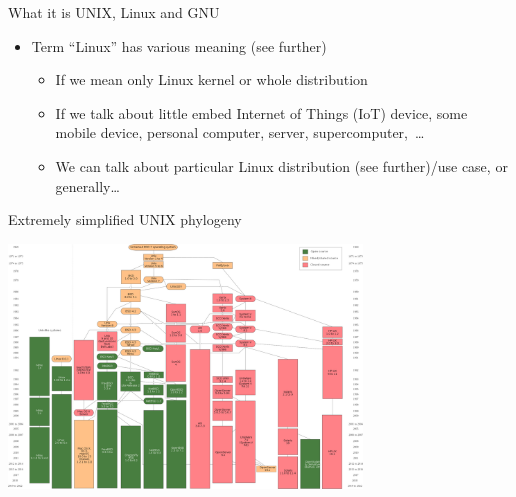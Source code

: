 \documentclass[compress, ucs, xelatex, 11pt, xcolor=svgnames, aspectratio=169,
	hyperref={
		bookmarks=true,
		unicode=true,
		colorlinks=true,
		pdftitle={Linux, command line and MetaCentrum},
		plainpages=false,
		pdfauthor={Vojtech Zeisek},
		pdfsubject={Course about use of Linux command line, writing shell scripts and using MetaCentrum of CESNET},
		pdfcreator={XeLaTeX},
		pdfkeywords={Linux, GNU, BASH, shell, command line, MetaCentrum},
		linkcolor=DarkRed, %
		anchorcolor=DarkBlue, %
		citecolor=Indigo, %
		filecolor=NavyBlue, %
		menucolor=DarkMagenta, %
		urlcolor=DarkBlue, %
		pdftex},
	url={hyphens, lowtilde} %
	]{beamer}
\begin{document}
\begin{frame}[allowframebreaks]{What it is UNIX, Linux and GNU}
\begin{itemize}
		\item Term \enquote{Linux} has various meaning (see further)
		\begin{itemize}
			\item If we mean only Linux kernel or whole distribution
			\item If we talk about little embed Internet of Things (IoT) device, some mobile device, personal computer, server, supercomputer,~\ldots
			\item We can talk about particular Linux distribution (see further)/use case, or generally\ldots
		\end{itemize}
	\end{itemize}
\end{frame}

\begin{frame}{Extremely simplified UNIX phylogeny}
	\begin{center}
		\includegraphics[height=6.5cm]{unix_history-simple.png}
	\end{center}
\end{frame}
\end{document}
